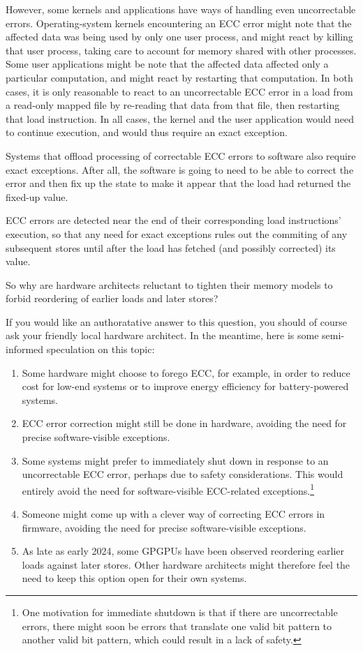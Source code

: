 \documentclass[10]{article}
\begin{document}
However, some kernels and applications have ways of handling even
uncorrectable errors.
Operating-system kernels encountering an ECC error might note that the
affected data was being used by only one user process, and might react by
killing that user process, taking care to account for memory shared with
other processes.
Some user applications might be note that the affected data affected only
a particular computation, and might react by restarting that computation.
In both cases, it is only reasonable to react to an uncorrectable ECC
error in a load from a read-only mapped file by re-reading that data
from that file, then restarting that load instruction.
In all cases, the kernel and the user application would need to continue
execution, and would thus require an exact exception.

Systems that offload processing of correctable ECC errors to software
also require exact exceptions.
After all, the software is going to need to be able to correct the error
and then fix up the state to make it appear that the load had returned
the fixed-up value.

ECC errors are detected near the end of their corresponding load
instructions' execution, so that any need for exact exceptions rules out
the commiting of any subsequent stores until after the load has fetched
(and possibly corrected) its value.

So why are hardware architects reluctant to tighten their memory models
to forbid reordering of earlier loads and later stores?

If you would like an authoratative answer to this question, you should of
course ask your friendly local hardware architect.
In the meantime, here is some semi-informed speculation on this topic:

\begin{enumerate}
\item	Some hardware might choose to forego ECC, for example, in order to
	reduce cost for low-end systems or to improve energy efficiency
	for battery-powered systems.
\item	ECC error correction might still be done in hardware, avoiding
	the need for precise software-visible exceptions.
\item	Some systems might prefer to immediately shut down in response to
	an uncorrectable ECC error, perhaps due to safety considerations.
	This would entirely avoid the need for software-visible
	ECC-related exceptions.\footnote{
		One motivation for immediate shutdown is that if there
		are uncorrectable errors, there might soon be errors
		that translate one valid bit pattern to another valid
		bit pattern, which could result in a lack of safety.}
\item	Someone might come up with a clever way of correcting ECC errors
	in firmware, avoiding the need for precise software-visible
	exceptions.
\item	As late as early 2024, some GPGPUs have been observed reordering
	earlier loads against later stores.
	Other hardware architects might therefore feel the need to keep
	this option open for their own systems.
\end{enumerate}
\end{document}
